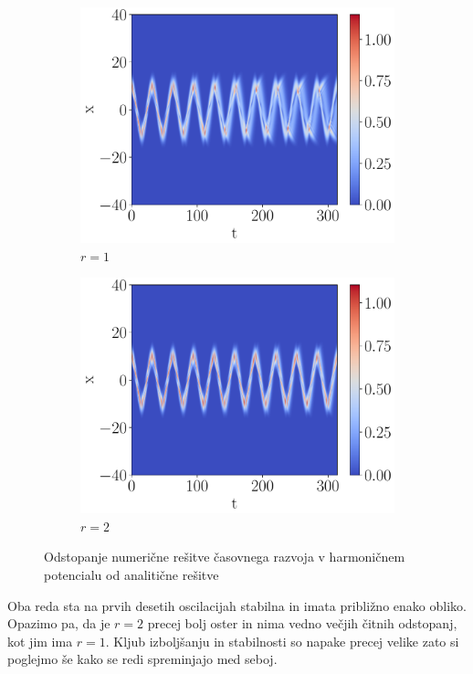 \documentclass{article}
\begin{document}
\begin{figure}[H]
    \centering
    \begin{subfigure}{0.45\textwidth}
        \centering
        \includegraphics[width=\linewidth]{red1.pdf}
        \caption{$r=1$}
    \end{subfigure}
    \hfill
    \begin{subfigure}{0.45\textwidth}
        \centering
        \includegraphics[width=\linewidth]{red2.pdf}
        \caption{$r=2$}
    \end{subfigure}
	\caption{Odstopanje numerične rešitve časovnega razvoja v harmoničnem potencialu od analitične rešitve}
\end{figure}
Oba reda sta na prvih desetih oscilacijah stabilna in imata približno enako obliko. Opazimo pa, da je $r=2$ precej bolj oster in nima vedno večjih čitnih odstopanj, kot jim ima $r=1$. Kljub izboljšanju in stabilnosti so napake precej velike zato si poglejmo še kako se redi spreminjajo med seboj.
\end{document}
